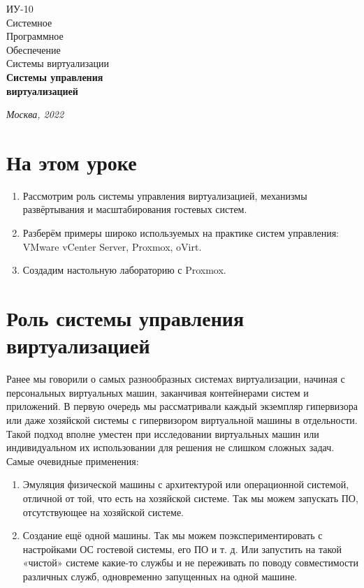 \documentclass[14pt, a4paper]{article}
\begin{document}
\begin{titlepage}
    \topmargin=216pt
    \newpage
    \hangindent=0.7cm
    \huge ИУ-10\\
    Системное\\
    Программное\\
    Обеспечение\\
    Системы виртуализации\\
    \textbf{Системы
    управления\\
    виртуализацией}

    \vspace{9cm}

    \begin{center}
        \small\textit{Москва, 2022}
    \end{center}
\end{titlepage}

\section*{На этом уроке}
\begin{enumerate}
    \item Рассмотрим роль системы управления виртуализацией, механизмы развёртывания и
    масштабирования гостевых систем.
    \item Разберём примеры широко используемых на практике систем управления: VMware vCenter
    Server, Proxmox, oVirt.
    \item Создадим настольную лабораторию с Proxmox.
\end{enumerate} 

\tableofcontents 
\newpage

\section*{Роль системы управления виртуализацией} 

Ранее мы говорили о самых разнообразных системах виртуализации, начиная с персональных
виртуальных машин, заканчивая контейнерами систем и приложений. В первую очередь мы
рассматривали каждый экземпляр гипервизора или даже хозяйской системы с гипервизором
виртуальной машины в отдельности. Такой подход вполне уместен при исследовании виртуальных
машин или индивидуальном их использовании для решения не слишком сложных задач.\\

Самые очевидные применения:
\begin{enumerate}
    \item Эмуляция физической машины с архитектурой или операционной системой, отличной от той,
    что есть на хозяйской системе. Так мы можем запускать ПО, отсутствующее на хозяйской
    системе.
    \item Создание ещё одной машины. Так мы можем поэкспериментировать с настройками ОС
    гостевой системы, его ПО и т. д. Или запустить на такой «чистой» системе какие-то службы и
    не переживать по поводу совместимости различных служб, одновременно запущенных на
    одной машине.
\end{enumerate}
\end{document}
